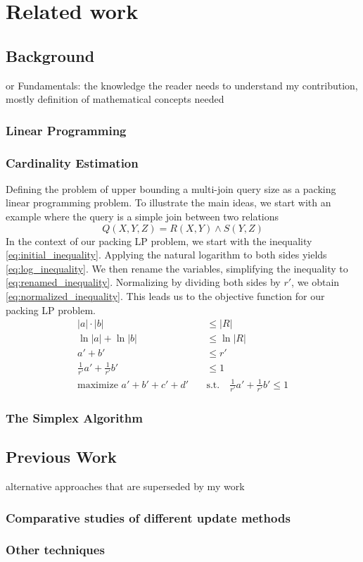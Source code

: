 
\chapter{Related work}\label{chapter:relatedwork}

\section{Background}
or Fundamentals: the knowledge the reader needs to understand my contribution, mostly definition of mathematical concepts needed
\subsection{Linear Programming}

\subsection{Cardinality Estimation}
Defining the problem of upper bounding a multi-join query size as a packing linear programming problem.
To illustrate the main ideas, we start with an example where the query is a simple join
between two relations
\[
Q(X, Y, Z) = R(X, Y) \land S(Y, Z)
\]
In the context of our packing LP problem, we start with the inequality \ref{eq:initial_inequality}. Applying the natural logarithm to both sides yields \ref{eq:log_inequality}. We then rename the variables, simplifying the inequality to \ref{eq:renamed_inequality}. 
Normalizing by dividing both sides by \(r'\), we obtain \ref{eq:normalized_inequality}. This leads us to the objective function for our packing LP problem.
\begin{align}
    |a| \cdot |b| &\leq |R| \label{eq:initial_inequality} \\
    \ln|a| + \ln|b| &\leq \ln|R| \label{eq:log_inequality} \\
    a' + b' &\leq r' \label{eq:renamed_inequality} \\
    \frac{1}{r'} a' + \frac{1}{r'} b' &\leq 1 \label{eq:normalized_inequality} \\
    \text{maximize } a' + b' + c' + d' \quad &\text{s.t.} \quad \frac{1}{r'} a' + \frac{1}{r'} b' \leq 1 \label{eq:objective_function}
    \end{align}
\subsection{The Simplex Algorithm}

\section{Previous Work}
alternative approaches that are superseded by my work
\subsection{Comparative studies of different update methods}
\subsection{Other techniques}
